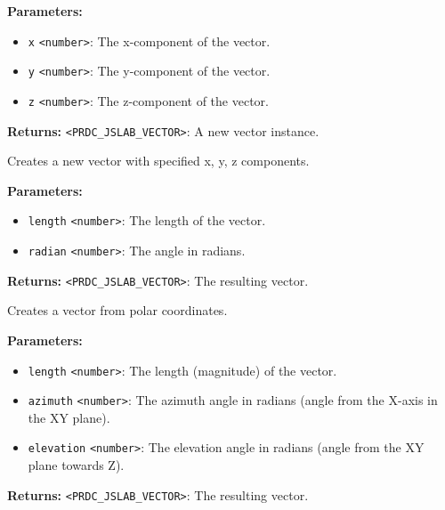 \documentclass[12pt,a4paper]{article}
\begin{document}
\noindent \textbf{Parameters:}
\begin{itemize}
  \item \texttt{x} \texttt{<number>}: The x-component of the vector.
  \item \texttt{y} \texttt{<number>}: The y-component of the vector.
  \item \texttt{z} \texttt{<number>}: The z-component of the vector.
\end{itemize}

\noindent \textbf{Returns:} \texttt{<PRDC\_JSLAB\_VECTOR>}: A new vector instance.

\noindent Creates a new vector with specified x, y, z components.

\vspace{5mm}
\noindent {}


\noindent \textbf{Parameters:}
\begin{itemize}
  \item \texttt{length} \texttt{<number>}: The length of the vector.
  \item \texttt{radian} \texttt{<number>}: The angle in radians.
\end{itemize}

\noindent \textbf{Returns:} \texttt{<PRDC\_JSLAB\_VECTOR>}: The resulting vector.

\noindent Creates a vector from polar coordinates.

\vspace{5mm}
\noindent {}


\noindent \textbf{Parameters:}
\begin{itemize}
  \item \texttt{length} \texttt{<number>}: The length (magnitude) of the vector.
  \item \texttt{azimuth} \texttt{<number>}: The azimuth angle in radians (angle from the X-axis in the XY plane).
  \item \texttt{elevation} \texttt{<number>}: The elevation angle in radians (angle from the XY plane towards Z).
\end{itemize}

\noindent \textbf{Returns:} \texttt{<PRDC\_JSLAB\_VECTOR>}: The resulting vector.
\end{document}
